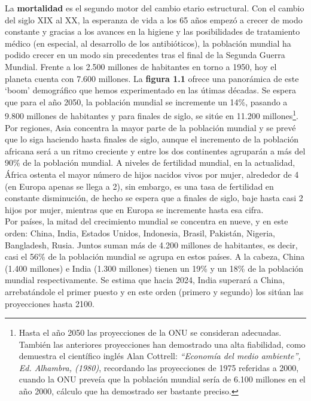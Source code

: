 \vspace{-0.2cm}
La \textbf{mortalidad} es el segundo motor del cambio etario estructural. Con el cambio del siglo XIX al XX, la esperanza de vida a los 65 a\~nos empez\'o a crecer de modo constante y gracias a los avances en la higiene y las posibilidades de tratamiento m\'edico (en especial, al desarrollo de los antibi\'oticos), la poblaci\'on mundial ha podido crecer en un modo sin precedentes tras el final de la Segunda Guerra Mundial. Frente a los 2.500 millones de habitantes en torno a 1950, hoy el planeta cuenta con 7.600 millones. La \textbf{figura 1.1} ofrece una panor\'amica de este `boom' demogr\'afico que hemos experimentado en las \'utimas d\'ecadas. Se espera que para el a\~no 2050, la poblaci\'on mundial se incremente un 14\%, pasando a 9.800 millones de habitantes y para finales de siglo, se sit\'ue en 11.200 millones\footnote{Hasta el a\~no 2050 las proyecciones de la ONU se consideran adecuadas. Tambi\'en las anteriores proyecciones han demostrado una alta fiabilidad, como demuestra el cient\'ifico ingl\'es Alan Cottrell: \textit{``Econom\'ia del medio ambiente'', Ed. Alhambra, (1980)}, recordando las proyecciones de 1975 referidas a 2000, cuando la ONU preve\'ia que la poblaci\'on mundial ser\'ia de 6.100 millones en el a\~no 2000, c\'alculo que ha demostrado ser bastante preciso.}. Por regiones, Asia concentra la mayor parte de la poblaci\'on mundial y se prev\'e que lo siga haciendo hasta finales de siglo, aunque el incremento de la poblaci\'on africana ser\'a a un ritmo creciente y entre los dos continentes agrupar\'an a m\'as del 90\% de la poblaci\'on mundial. A niveles de fertilidad mundial, en la actualidad, \'Africa ostenta el mayor n\'umero de hijos nacidos vivos por mujer, alrededor de 4 (en Europa apenas se llega a 2), sin embargo, es una tasa de fertilidad en constante disminuci\'on, de hecho se espera que a finales de siglo, baje hasta casi 2 hijos por mujer, mientras que en Europa se incremente hasta esa cifra.\\

\vspace{-0.2cm}
Por pa\'ises, la mitad del crecimiento mundial se concentra en nueve, y en este orden: China, India, Estados Unidos, Indonesia, Brasil, Pakist\'an, Nigeria, Bangladesh, Rusia. Juntos suman m\'as de 4.200 millones de habitantes, es decir, casi el 56\% de la poblaci\'on mundial se agrupa en estos pa\'ises. A la cabeza, China (1.400 millones) e India (1.300 millones) tienen un 19\% y un 18\% de la poblaci\'on mundial respectivamente. Se estima que hacia 2024, India superar\'a a China, arrebat\'andole el primer puesto y en este orden (primero y segundo) los sit\'uan las proyecciones hasta 2100.\\

